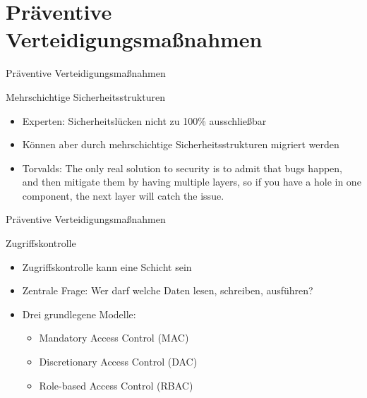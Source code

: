 \newcommand{\gqq}[1]{\glqq#1\grqq}

\section{Präventive Verteidigungsmaßnahmen}

\begin{frame}{Präventive Verteidigungsmaßnahmen}
        \begin{block}{Mehrschichtige Sicherheitsstrukturen}
                \begin{itemize}[<+->]
                        \item Experten: Sicherheitslücken nicht zu 100\% ausschließbar
                        \item Können aber durch mehrschichtige Sicherheitsstrukturen migriert werden
                        \item Torvalds: \gqq{The only real solution to security is to admit that bugs happen, and then mitigate them by having multiple layers, so if you have a hole in one component, the next layer will catch the issue.} \footnotemark 
                \end{itemize}
        \end{block}
        
\end{frame}

\begin{frame}{Präventive Verteidigungsmaßnahmen}
        \begin{block}{Zugriffskontrolle}
                \begin{itemize}[<+->]
                        \item Zugriffskontrolle kann eine Schicht sein
                        \item Zentrale Frage: Wer darf welche Daten lesen, schreiben, ausführen?
                        \item Drei grundlegene Modelle:
                        \begin{itemize}[<+->]
                                \item Mandatory Access Control (MAC)
                                \item Discretionary Access Control (DAC)
                                \item Role-based Access Control (RBAC)
                        \end{itemize}
                \end{itemize}
        \end{block}
\end{frame}

